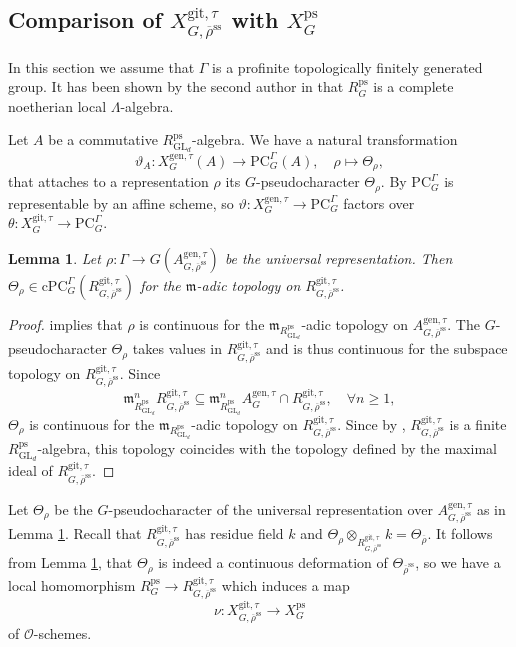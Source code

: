 \documentclass{amsart}
\newtheorem{lem}[prop]{Lemma}
\theoremstyle{definition}
\theoremstyle{remark}
\DeclareMathOperator{\GL}{GL}
\newcommand{\mm}{\mathfrak m}
\newcommand{\OO}{\mathcal O}
\newcommand{\rhobar}{\overline{\rho}}
\newcommand{\ps}{\mathrm{ps}}
\newcommand{\gen}{\mathrm{gen}}
\newcommand{\gps}{\mathrm{git}}
\newcommand{\RpsGLd}{R^{\ps}_{\GL_d}}
\newcommand{\RpsG}{R^{\ps}_G}
\newcommand{\rhobarss}{\rhobar^{\mathrm{ss}}}
\newcommand{\PC}{\mathrm{PC}}
\newcommand{\cPC}{\mathrm{cPC}}
\newcommand{\AgenGtau}{A^{\gen, \tau}_G}
\newcommand{\AgenGtaurhobarss}{A^{\gen, \tau}_{G, \rhobarss}}
\begin{document}
\subsection{\texorpdfstring{Comparison of $X^{\gps,\tau}_{G,\rhobarss}$ with $X^{\ps}_G$}{Comparison of XgpsGrhobarss with XpsG}}\label{comparison} In this section we assume that $\Gamma$ is
a profinite topologically finitely generated group. It has been shown by the second author in \cite[Theorem A]{quast} that $\RpsG$ is a complete noetherian local $\Lambda$-algebra. 

Let $A$ be a commutative $\RpsGLd$-algebra. We have a natural transformation
$$ \vartheta_A : X^{\gen,\tau}_G(A) \to \PC_G^{\Gamma}(A), \quad\rho \mapsto \Theta_{\rho}, $$
that attaches to a representation $\rho$ its $G$-pseudocharacter $\Theta_{\rho}$.
By \cite[Theorem 3.20]{quast} $\PC_G^{\Gamma}$ is representable by an affine scheme, so $\vartheta : X^{\gen,\tau}_G \to \PC_G^{\Gamma}$ factors over $\theta : X^{\gps,\tau}_G \to \PC_G^{\Gamma}$.

\begin{lem}\label{abstz} Let $\rho:\Gamma \rightarrow G(A^{\gen, \tau}_{G, \rhobarss})$ be the universal
representation. Then $\Theta_{\rho}\in \cPC_G^{\Gamma}(R^{\gps, \tau}_{G, \rhobarss})$ for 
the $\mm$-adic topology on $R^{\gps, \tau}_{G, \rhobarss}$.
\end{lem}
\begin{proof}  implies that $\rho$ is continuous for the  $\mm_{\RpsGLd}$-adic topology on $\AgenGtaurhobarss$.
    The  $G$-pseudocharacter $\Theta_{\rho}$ takes values in $R^{\gps,\tau}_{G,\rhobarss}$ and is thus continuous for the subspace topology on $R^{\gps,\tau}_{G,\rhobarss}$. Since 
    $$\mm_{\RpsGLd}^n R^{\gps, \tau}_{G, \rhobarss}\subseteq \mm_{\RpsGLd}^n \AgenGtau \cap R^{\gps,\tau}_{G, \rhobarss}, \quad \forall n\ge 1,$$
$\Theta_{\rho}$ is continuous for the $\mm_{\RpsGLd}$-adic topology on $R^{\gps,\tau}_{G, \rhobarss}$.
Since by , $R^{\gps,\tau}_{G,\rhobarss}$ is a finite $\RpsGLd$-algebra, this topology coincides with the topology defined by the maximal ideal of $R^{\gps,\tau}_{G,\rhobarss}$.
\end{proof}

Let $\Theta_{\rho}$ be the $G$-pseudocharacter
of the universal representation over $A^{\gen, \tau}_{G, \rhobarss}$ as in Lemma \ref{abstz}.
Recall that $R^{\gps,\tau}_{G,\rhobarss}$ has residue field $k$ and 
$\Theta_{\rho}\otimes_{R^{\gps,\tau}_{G,\rhobarss}} k = \Theta_{\rhobar}$. 
It follows from Lemma  \ref{abstz}, that $\Theta_{\rho}$ 
is indeed a continuous deformation of $\Theta_{\rhobarss}$, so we have a local homomorphism $R^{\ps}_G \to R^{\gps,\tau}_{G,\rhobarss}$ which induces a map
\begin{equation}\label{XgpsXpsmap}
    \nu : X^{\gps,\tau}_{G,\rhobarss} \to X^{\ps}_G 
\end{equation}
of $\OO$-schemes.
\end{document}
